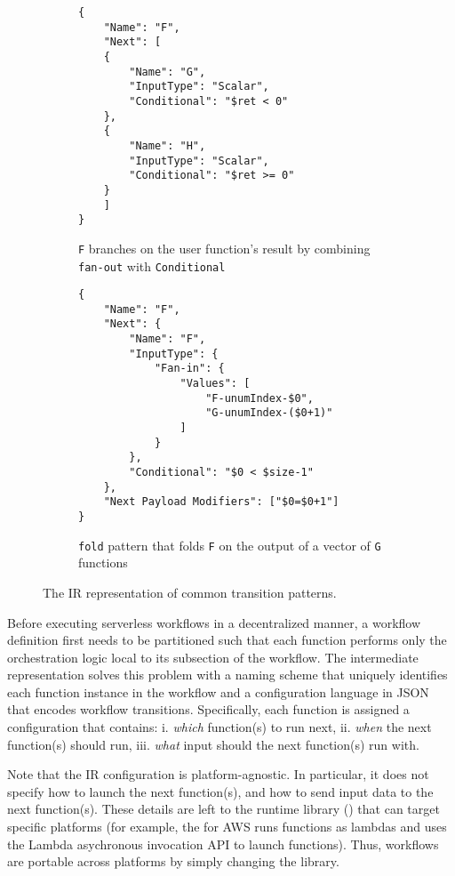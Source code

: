 \begin{figure*}[t!]
	\begin{subfigure}[t]{\columnwidth}
		\centering
		\begin{verbatim}
{
	"Name": "F",
	"Next": [
	{
		"Name": "G",
		"InputType": "Scalar",
		"Conditional": "$ret < 0"
	},
	{
		"Name": "H",
		"InputType": "Scalar",
		"Conditional": "$ret >= 0"
	}
	]
}
		\end{verbatim}
		\caption{\texttt{F} branches on the user function's result by
		combining \texttt{fan-out} with \texttt{Conditional}}
		\label{fig:gadget-examples-branch}
	\end{subfigure}

	\begin{subfigure}[t]{\columnwidth}
		\centering
		\begin{verbatim}
{
    "Name": "F",
    "Next": {
        "Name": "F",
        "InputType": {
            "Fan-in": {
                "Values": [
                    "F-unumIndex-$0",
                    "G-unumIndex-($0+1)"
                ]
            }
        },
        "Conditional": "$0 < $size-1"
    },
    "Next Payload Modifiers": ["$0=$0+1"]
}
		\end{verbatim}
		\caption{\texttt{fold} pattern that folds \texttt{F} on the output of
		a vector of \texttt{G} functions}
		\label{fig:gadget-examples-fold}
	\end{subfigure}

	\caption{The \name{} IR representation of common transition patterns.}
	\label{fig:ir-examples}
\end{figure*}

Before executing serverless workflows in a decentralized manner, a workflow
definition first needs to be partitioned such that each function performs only
the orchestration logic local to its subsection of the workflow. The \name{}
intermediate representation solves this problem with a naming scheme that
uniquely identifies each function instance in the workflow and a configuration
language in JSON that encodes workflow transitions. Specifically, each
function is assigned a configuration that contains: i. \textit{which}
function(s) to run next, ii. \textit{when} the next function(s) should run,
iii. \textit{what} input should the next function(s) run with.

Note that the IR configuration is platform-agnostic. In particular, it does
not specify how to launch the next function(s), and how to send input data to
the next function(s). These details are left to the \name{} runtime library
(\deorc{}) that can target specific platforms (for example, the \deorc{} for
AWS runs functions as lambdas and uses the Lambda asychronous invocation API
to launch functions). Thus, workflows are portable across platforms by simply
changing the \deorc{} library.

